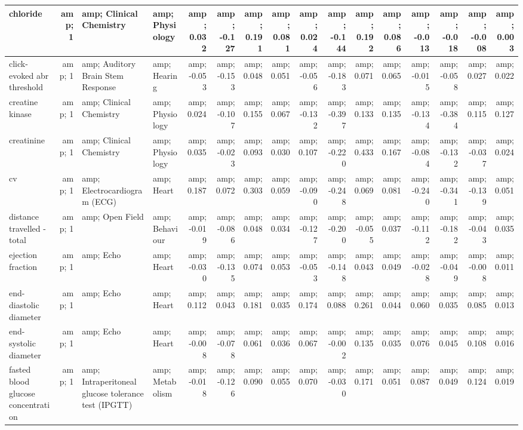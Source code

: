 \documentclass[]{article}
\begin{document}
\begin{table}
\begin{tabular}[t]{l|r|l|l|r|r|r|r|r|r|r|r|r|r|r|r}
\hline
chloride &amp; 1 &amp; Clinical Chemistry &amp; Physiology &amp; 0.032 &amp; -0.127 &amp; 0.191 &amp; 0.081 &amp; 0.024 &amp; -0.144 &amp; 0.192 &amp; 0.086 &amp; -0.013 &amp; -0.018 &amp; -0.008 &amp; 0.003\\
\hline
click-evoked abr threshold &amp; 1 &amp; Auditory Brain Stem Response &amp; Hearing &amp; -0.053 &amp; -0.153 &amp; 0.048 &amp; 0.051 &amp; -0.056 &amp; -0.183 &amp; 0.071 &amp; 0.065 &amp; -0.015 &amp; -0.058 &amp; 0.027 &amp; 0.022\\
\hline
creatine kinase &amp; 1 &amp; Clinical Chemistry &amp; Physiology &amp; 0.024 &amp; -0.107 &amp; 0.155 &amp; 0.067 &amp; -0.132 &amp; -0.397 &amp; 0.133 &amp; 0.135 &amp; -0.134 &amp; -0.384 &amp; 0.115 &amp; 0.127\\
\hline
creatinine &amp; 1 &amp; Clinical Chemistry &amp; Physiology &amp; 0.035 &amp; -0.023 &amp; 0.093 &amp; 0.030 &amp; 0.107 &amp; -0.220 &amp; 0.433 &amp; 0.167 &amp; -0.084 &amp; -0.132 &amp; -0.037 &amp; 0.024\\
\hline
cv &amp; 1 &amp; Electrocardiogram (ECG) &amp; Heart &amp; 0.187 &amp; 0.072 &amp; 0.303 &amp; 0.059 &amp; -0.090 &amp; -0.248 &amp; 0.069 &amp; 0.081 &amp; -0.240 &amp; -0.341 &amp; -0.139 &amp; 0.051\\
\hline
distance travelled - total &amp; 1 &amp; Open Field &amp; Behaviour &amp; -0.019 &amp; -0.086 &amp; 0.048 &amp; 0.034 &amp; -0.127 &amp; -0.200 &amp; -0.055 &amp; 0.037 &amp; -0.112 &amp; -0.182 &amp; -0.043 &amp; 0.035\\
\hline
ejection fraction &amp; 1 &amp; Echo &amp; Heart &amp; -0.030 &amp; -0.135 &amp; 0.074 &amp; 0.053 &amp; -0.053 &amp; -0.148 &amp; 0.043 &amp; 0.049 &amp; -0.028 &amp; -0.049 &amp; -0.008 &amp; 0.011\\
\hline
end-diastolic diameter &amp; 1 &amp; Echo &amp; Heart &amp; 0.112 &amp; 0.043 &amp; 0.181 &amp; 0.035 &amp; 0.174 &amp; 0.088 &amp; 0.261 &amp; 0.044 &amp; 0.060 &amp; 0.035 &amp; 0.085 &amp; 0.013\\
\hline
end-systolic diameter &amp; 1 &amp; Echo &amp; Heart &amp; -0.008 &amp; -0.078 &amp; 0.061 &amp; 0.036 &amp; 0.067 &amp; -0.002 &amp; 0.135 &amp; 0.035 &amp; 0.076 &amp; 0.045 &amp; 0.108 &amp; 0.016\\
\hline
fasted blood glucose concentration &amp; 1 &amp; Intraperitoneal glucose tolerance test (IPGTT) &amp; Metabolism &amp; -0.018 &amp; -0.126 &amp; 0.090 &amp; 0.055 &amp; 0.070 &amp; -0.030 &amp; 0.171 &amp; 0.051 &amp; 0.087 &amp; 0.049 &amp; 0.124 &amp; 0.019\\

\end{tabular}
\end{table}
\end{document}
